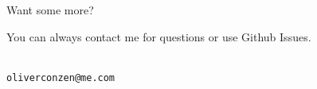 \begin{frame}{Want some more?}

You can always contact me for questions or use Github Issues.

\vspace{\fill}

\LARGE {\insertauthor} \\
\texttt{oliverconzen@me.com}

\end{frame}